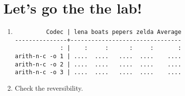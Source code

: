 
\section*{Let's go the the lab!}
\begin{enumerate}
\item
\begin{verbatim}
         Codec | lena boats pepers zelda Average
---------------+--------------------------------
             : |    :     :      :     :       :
arith-n-c -o 1 | ....  ....   ....  ....    ....
arith-n-c -o 2 | ....  ....   ....  ....    ....
arith-n-c -o 3 | ....  ....   ....  ....    ....
\end{verbatim}
\item Check the reversibility.
\end{enumerate}


